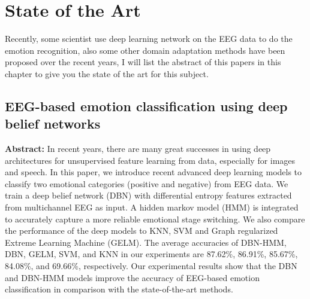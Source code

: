 
\chapter{State of the Art} %

\label{Chapter3} %

Recently, some scientist use deep learning network on the EEG data to do the emotion recognition, also some other domain adaptation methods have been proposed over the recent years, I will list the abstract of this papers in this chapter to give you the state of the art for this subject.

\section{EEG-based emotion classification using deep belief networks}
\textbf{Abstract:}\cite{zheng2014eeg}
In recent years, there are many great successes in using deep architectures for unsupervised feature learning from data, especially for images and speech. In this paper, we introduce recent advanced deep learning models to classify two emotional categories (positive and negative) from EEG data. We train a deep belief network (DBN) with differential entropy features extracted from multichannel EEG as input. A hidden markov model (HMM) is integrated to accurately capture a more reliable emotional stage switching. We also compare the performance of the deep models to KNN, SVM and Graph regularized Extreme Learning Machine (GELM). The average accuracies of DBN-HMM, DBN, GELM, SVM, and KNN in our experiments are 87.62\%, 86.91\%, 85.67\%, 84.08\%, and 69.66\%, respectively. Our experimental results show that the DBN and DBN-HMM models improve the accuracy of EEG-based emotion classification in comparison with the state-of-the-art methods.


